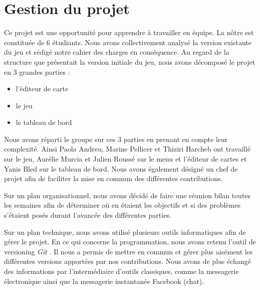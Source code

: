 \documentclass[english,11pt]{report}
\begin{document}
\chapter{Gestion du projet}

Ce projet est une opportunité pour apprendre à travailler en équipe. La nôtre est constituée de 6 étudiants. Nous avons collectivement analysé la version existante du jeu et rédigé notre cahier des charges en conséquence. Au regard de la structure que présentait la version initiale du jeu, nous avons décomposé le projet en 3 grandes parties :\par
\vspace{0,1cm}
\begin{itemize}
    \item{l'éditeur de carte}
    \item{le jeu}
    \item{le tableau de bord}
\end{itemize}\par
\vspace{0,1cm}
Nous avons réparti le groupe sur ces 3 parties en prenant en compte leur complexité. Ainsi Paola Andreu, Marine Pellicer et Thiziri Harcheb ont travaillé sur le jeu, Aurélie Murcia et Julien Roussé sur le menu et l’éditeur de cartes et Yanis Bled sur le tableau de bord. Nous avons également désigné un chef de projet afin de faciliter la mise en commun des différentes contributions.\par
\vspace{0,5cm}
Sur un plan organisationnel, nous avons décidé de faire une réunion bilan toutes les semaines afin de déterminer où en étaient les objectifs et si des problèmes s'étaient posés durant l'avancée des différentes parties.\par
\vspace{0,1cm}
Sur un plan technique, nous avons utilisé plusieurs outils informatiques afin de gérer le projet. En ce qui concerne la programmation, nous avons retenu l’outil de versioning \emph{Git} \cite{gitlab}. Il nous a permis de mettre en commun et gérer plus aisément les différentes versions apportées par nos contributions. Nous avons de plus échangé des informations par l’intermédiaire d’outils classiques, comme la messagerie électronique ainsi que la messagerie instantanée Facebook (chat).\par
\vspace{0,5cm}
\end{document}
